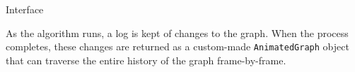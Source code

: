 \documentclass{beamer}
\begin{document}
\begin{frame}[fragile,t]
\begin{columns}[t]
\begin{column}{.45\textwidth}
\begin{block}{Interface}
        \setlength\fboxsep{0pt}
        \setlength\fboxrule{.1ex}
        \vspace*{-.75in}
        \begin{center}
        \end{center}
        \begin{minipage}[b]{.49\linewidth}
          \raggedleft

          As the algorithm runs, a log is kept of changes to the
          graph.  When the process completes, these changes are
          returned as a custom-made \texttt{AnimatedGraph} object that
          can traverse the entire history of the graph frame-by-frame.

          \vspace*{2ex}
        \end{minipage}%
        \vspace*{-1ex}
      \end{block}
    \end{column}
  \end{columns}
\end{frame}
\end{document}
